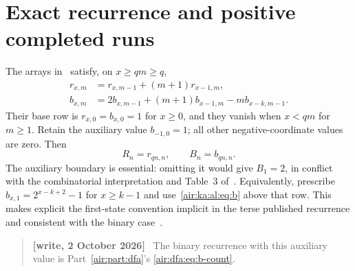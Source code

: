 \documentclass[11pt,letterpaper]{article}
\numberwithin{equation}{section}
\theoremstyle{remark}
\newenvironment{writenote}{\par\smallskip\begin{quote}\small\textbf{[write, 2 October 2026]}\ }{\end{quote}\smallskip}
\begin{document}
\section{Exact recurrence and positive completed runs}\label{air:ka:al:sec:runs}
The arrays in~\cite[Propositions~8 and~12]{gdw} satisfy, on $x\ge qm\ge q$,
\begin{align}
r_{x,m}&=r_{x,m-1}+(m+1)r_{x-1,m},\label{air:ka:al:eq:r}\\
b_{x,m}&=2b_{x,m-1}+(m+1)b_{x-1,m}-m b_{x-k,m-1}.\label{air:ka:al:eq:b}
\end{align}
Their base row is $r_{x,0}=b_{x,0}=1$ for $x\ge0$, and they vanish when
$x<qm$ for $m\ge1$. Retain the auxiliary value $b_{-1,0}=1$; all other
negative-coordinate values are zero. Then
\[
R_n=r_{qn,n},\qquad B_n=b_{qn,n}.
\]
The auxiliary boundary is essential: omitting it would give $B_1=2$, in
conflict with the combinatorial interpretation and Table~3 of~\cite{gdw}.
Equivalently, prescribe
$b_{x,1}=2^{x-k+2}-1$ for $x\ge k-1$ and use~\eqref{air:ka:al:eq:b} above that row.
This makes explicit the first-state convention implicit in the terse
published recurrence and consistent with the binary case~\cite{dfa}.
\begin{writenote}
The binary recurrence with this auxiliary value is Part~\ref{air:part:dfa}'s \eqref{air:dfa:eq:b-count}.
\end{writenote}
\end{document}
